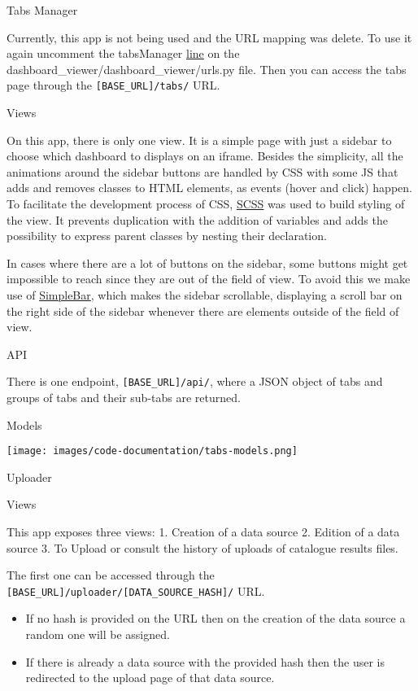 \documentclass[
]{book}
\providecommand{\tightlist}{%
  \setlength{\itemsep}{0pt}\setlength{\parskip}{0pt}}
\begin{document}
Tabs Manager

Currently, this app is not being used and the URL mapping was delete.
To use it again uncomment the tabsManager \href{https://github.com/EHDEN/NetworkDashboards/blob/master/dashboard_viewer/dashboard_viewer/urls.py\#L29}{line} on the dashboard\_viewer/dashboard\_viewer/urls.py file.
Then you can access the tabs page through the \texttt{{[}BASE\_URL{]}/tabs/} URL.

Views

On this app, there is only one view.
It is a simple page with just a sidebar to choose which dashboard to displays on an iframe.
Besides the simplicity, all the animations around the sidebar buttons are handled by CSS with some JS that adds and removes classes to HTML elements, as events (hover and click) happen.
To facilitate the development process of CSS, \href{https://sass-lang.com/}{SCSS} was used to build styling of the view.
It prevents duplication with the addition of variables and adds the possibility to express parent classes by nesting their declaration.

In cases where there are a lot of buttons on the sidebar, some buttons might get impossible to reach since they are out of the field of view.
To avoid this we make use of \href{https://github.com/Grsmto/simplebar}{SimpleBar}, which makes the sidebar scrollable, displaying a scroll bar on the right side of the sidebar whenever there are elements outside of the field of view.

API

There is one endpoint, \texttt{{[}BASE\_URL{]}/api/}, where a JSON object of tabs and groups of tabs and their sub-tabs are returned.

Models

\texttt{[image: images/code-documentation/tabs-models.png]}

Uploader

Views

This app exposes three views:
1. Creation of a data source
2. Edition of a data source
3. To Upload or consult the history of uploads of catalogue results files.

The first one can be accessed through the \texttt{{[}BASE\_URL{]}/uploader/{[}DATA\_SOURCE\_HASH{]}/} URL.

\begin{itemize}
\tightlist
\item
  If no hash is provided on the URL then on the creation of the data source a random one will be assigned.
\item
  If there is already a data source with the provided hash then the user is redirected to the upload page of that data source.
\end{itemize}
\end{document}
